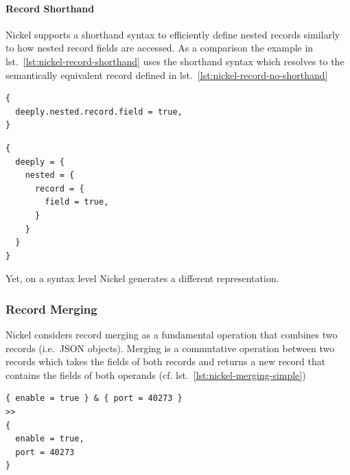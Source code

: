 \documentclass[
  a4paper,
  bibtex,
  english,
  nomenclature]{kthlatex/kththesis/kththesis}
\begin{document}
\hypertarget{sec:record-shorthand}{%
\paragraph{Record Shorthand}\label{sec:record-shorthand}}

Nickel supports a shorthand syntax to efficiently define nested records
similarly to how nested record fields are accessed. As a comparison the
example in lst.~\ref{lst:nickel-record-shorthand} uses the shorthand
syntax which resolves to the semantically equivalent record defined in
lst.~\ref{lst:nickel-record-no-shorthand}

\begin{codelisting}

\caption{Nickel record defined using shorthand}

\hypertarget{lst:nickel-record-shorthand}{%
\label{lst:nickel-record-shorthand}}%
\begin{verbatim}
{
  deeply.nested.record.field = true,
}
\end{verbatim}

\end{codelisting}

\begin{codelisting}

\caption{Nickel record defined explicitly}

\hypertarget{lst:nickel-record-no-shorthand}{%
\label{lst:nickel-record-no-shorthand}}%
\begin{verbatim}
{
  deeply = {
    nested = {
      record = { 
        field = true,
      }
    }
  }
}
\end{verbatim}

\end{codelisting}

Yet, on a syntax level Nickel generates a different representation.

\hypertarget{sec:record-merging}{%
\subsubsection{Record Merging}\label{sec:record-merging}}

Nickel considers record merging as a fundamental operation that combines
two records (i.e.~JSON objects). Merging is a commutative operation
between two records which takes the fields of both records and returns a
new record that contains the fields of both operands (cf.
lst.~\ref{lst:nickel-merging-simple})

\begin{codelisting}

\caption{Merging of two records without shared fields}

\hypertarget{lst:nickel-merging-simple}{%
\label{lst:nickel-merging-simple}}%
\begin{verbatim}
{ enable = true } & { port = 40273 }
>>
{
  enable = true,
  port = 40273
}
\end{verbatim}

\end{codelisting}
\end{document}
